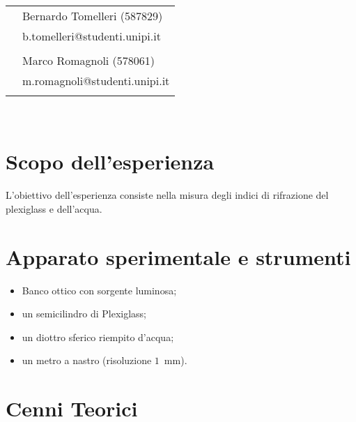 \documentclass{article}[a4paper,11pt]
\begin{document}
\begin{titlepage}
	\begin{center}
		{\huge{\textbf{\thetitle}}}\\\vspace*{15mm}
		\begin{tabular}{ll}
		& Bernardo Tomelleri (587829) \\
		& b.tomelleri@studenti.unipi.it\\ \\
		& Marco Romagnoli (578061) \\
		& m.romagnoli@studenti.unipi.it \\ \\
		\end{tabular}\\\vspace*{5mm}
		{\thedate}
	\end{center}
\end{titlepage}
\makeatother
\restoregeometry
\newpage
\section{Scopo dell'esperienza}
L'obiettivo dell'esperienza consiste nella misura degli indici di rifrazione del plexiglass e dell'acqua.

\section{Apparato sperimentale e strumenti}
\begin{itemize}
\item Banco ottico con sorgente luminosa;
\item un semicilindro di Plexiglass;
\item un diottro sferico riempito d'acqua;
\item un metro a nastro (risoluzione $1$~mm).
\end{itemize}

\section{Cenni Teorici}
\end{document}
